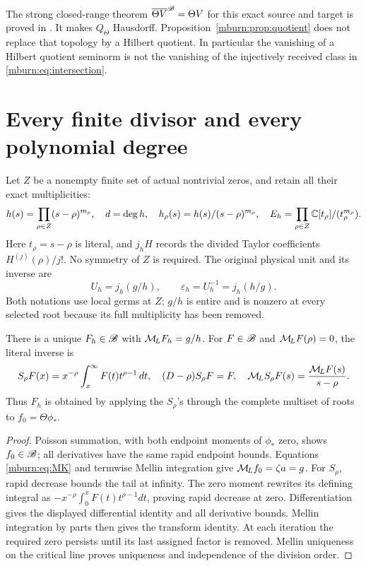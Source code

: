 \documentclass[11pt]{article}
\begin{document}
The strong closed-range theorem $\overline{\Theta V}^{\mathscr B}=\Theta V$
for this exact source and target is proved in \cite{mburn:ClosedTheta}.
It makes $Q_\Theta$ Hausdorff. Proposition~\ref{mburn:prop:quotient}
does not replace that topology by a Hilbert quotient. In particular
the vanishing of a Hilbert quotient seminorm is not the vanishing
of the injectively received class in \eqref{mburn:eq:intersection}.

\section{Every finite divisor and every polynomial degree}

Let $Z$ be a nonempty finite set of actual nontrivial zeros, and
retain all their exact multiplicities:
\begin{equation}\label{mburn:eq:h}
 h(s)=\prod_{\rho\in Z}(s-\rho)^{m_\rho},\quad d=\deg h,
 \quad h_\rho(s)=h(s)/(s-\rho)^{m_\rho},\quad
 E_h=\prod_{\rho\in Z}\mathbb C[t_\rho]/(t_\rho^{m_\rho}).
\end{equation}
Here $t_\rho=s-\rho$ is literal, and $j_hH$ records the divided
Taylor coefficients $H^{(j)}(\rho)/j!$. No symmetry of $Z$ is
required. The original physical unit and its inverse are
\begin{equation}\label{mburn:eq:unit}
 U_h=j_h(g/h),\qquad \varepsilon_h=U_h^{-1}=j_h(h/g).
\end{equation}
Both notations use local germs at $Z$; $g/h$ is entire and is
nonzero at every selected root because its full multiplicity
has been removed.

\begin{mburnlemma}\label{mburn:lem:Fh}
There is a unique $F_h\in\mathscr B$ with $\mathcal M_{\!L} F_h=g/h$.
For $F\in\mathscr B$ and $\mathcal M_{\!L} F(\rho)=0$, the literal inverse is
\[
 S_\rho F(x)=x^{-\rho}\int_x^\infty F(t)t^{\rho-1}\,dt,
 \quad(D-\rho)S_\rho F=F,\quad
 \mathcal M_{\!L} S_\rho F(s)=\frac{\mathcal M_{\!L} F(s)}{s-\rho}.
\]
Thus $F_h$ is obtained by applying the $S_\rho$'s through
the complete multiset of roots to $f_0=\Theta\phi_*$.
\end{mburnlemma}
\begin{proof}
Poisson summation, with both endpoint moments of $\phi_*$ zero,
shows $f_0\in\mathscr B$; all derivatives have the same rapid endpoint
bounds. Equations \eqref{mburn:eq:MK} and termwise Mellin integration
give $\mathcal M_{\!L} f_0=\zeta a=g$. For $S_\rho$, rapid decrease bounds
the tail at infinity. The zero moment rewrites its defining
integral as $-x^{-\rho}\int_0^xF(t)t^{\rho-1}dt$, proving rapid
decrease at zero. Differentiation gives the displayed differential
identity and all derivative bounds. Mellin integration by parts
then gives the transform identity. At each iteration the required
zero persists until its last assigned factor is removed.
Mellin uniqueness on the critical line proves uniqueness and
independence of the division order.
\end{proof}
\end{document}
